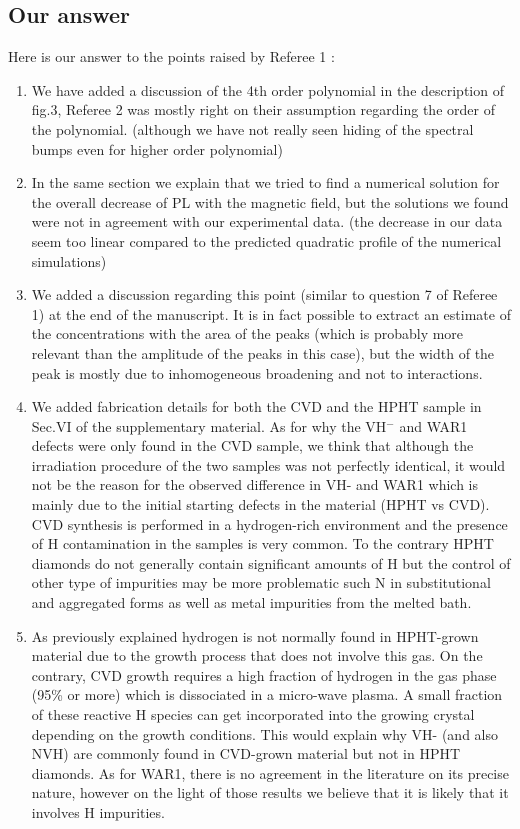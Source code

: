 \documentclass{article}
\begin{document}
\subsection*{Our answer}
Here is our answer to the points raised by Referee 1 :
\begin{enumerate}
\item We have added a discussion of the 4th order polynomial in the description of fig.3, Referee 2 was mostly right on their assumption regarding the order of the polynomial. (although we have not really seen hiding of the spectral bumps even for higher order polynomial)
\item In the same section we explain that we tried to find a numerical solution for the overall decrease of PL with the magnetic field, but the solutions we found were not in agreement with our experimental data. (the decrease in our data seem too linear compared to the predicted quadratic profile of the numerical simulations)
\item We added a discussion regarding this point (similar to question 7 of Referee 1) at the end of the manuscript. It is in fact possible to extract an estimate of the concentrations with the area of the peaks (which is probably more relevant than the amplitude of the peaks in this case), but the width of the peak is mostly due to inhomogeneous broadening and not to interactions.
\item We added fabrication details for both the CVD and the HPHT sample in Sec.VI of the supplementary material. As for why the VH$^-$ and WAR1 defects were only found in the CVD sample, we think that although the irradiation procedure of the two samples was not perfectly identical, it would not be the reason for the observed difference in VH- and WAR1 which is mainly due to the initial starting defects in the material (HPHT vs CVD). CVD synthesis is performed in a hydrogen-rich environment and the presence of H contamination in the samples is very common. To the contrary HPHT diamonds do not generally contain significant amounts of H but the control of other type of impurities may be more problematic such N in substitutional and aggregated forms as well as metal impurities from the melted bath.  
\item As previously explained hydrogen is not normally found in HPHT-grown material due to the growth process that does not involve this gas. On the contrary, CVD growth requires a high fraction of hydrogen in the gas phase (95\% or more) which is dissociated in a micro-wave plasma. A small fraction of these reactive H species can get incorporated into the growing crystal depending on the growth conditions. This would explain why VH- (and also NVH) are commonly found in CVD-grown material but not in HPHT diamonds. As for WAR1, there is no agreement in the literature on its precise nature, however on the light of those results we believe that it is likely that it involves H impurities. 

\end{enumerate}
\end{document}

